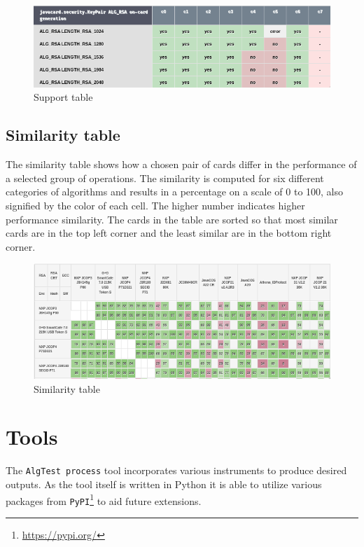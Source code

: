 \begin{figure}[h]
    \centering
    \includegraphics[width=\textwidth]{img/support-table.png}
    \caption{Support table}
    \label{fig:support-table}
\end{figure}

\subsection{Similarity table}
The similarity table shows how a chosen pair of cards differ in the performance of a selected group of operations. The similarity is computed for six different categories of algorithms and results in a percentage on a scale of 0 to 100, also signified by the color of each cell. The higher number indicates higher performance similarity. The cards in the table are sorted so that most similar cards are in the top left corner and the least similar are in the bottom right corner.

\begin{figure}[h]
    \centering
    \includegraphics[width=\textwidth]{img/similarity-table.png}
    \caption{Similarity table}
    \label{fig:similarity-table}
\end{figure}

\section{Tools}
The \texttt{AlgTest process} tool incorporates various instruments to produce desired outputs. As the tool itself is written in Python it is able to utilize various packages from \texttt{PyPI}\footnote{\url{https://pypi.org/}} to aid future extensions.

